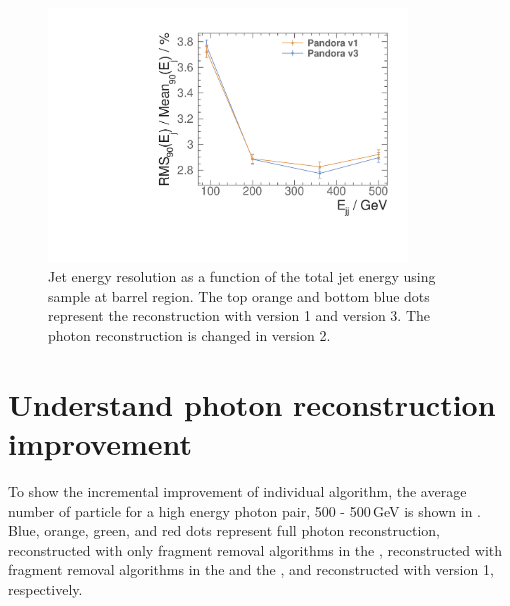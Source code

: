 
\begin{figure}[tbph]
\centering
\includegraphics[width=0.85\textwidth]{photon/JERnew.pdf}
\caption[Jet energy resolution as a function of the di-jet energy]
{Jet energy resolution as a function of the total jet energy using \Zuds sample at barrel region. The top orange and bottom blue dots represent the  reconstruction with \pandora version 1 and version 3. The photon reconstruction is changed in \pandora version 2.}
\label{fig:photonJER}
\end{figure}


\section{Understand photon reconstruction improvement}





To show the incremental improvement of individual algorithm, the average number of particle for a high energy photon pair, 500 - 500\,GeV is shown in . Blue, orange, green, and red dots represent full photon reconstruction, reconstructed with only fragment removal algorithms in the \ECAL, reconstructed with fragment removal algorithms in the \ECAL and the \HCAL, and reconstructed with \pandora version 1, respectively.

